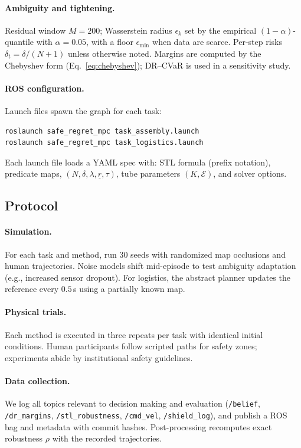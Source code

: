 \documentclass[journal]{IEEEtran}
\theoremstyle{definition}
\begin{document}
\paragraph*{Ambiguity and tightening.}
Residual window $M=200$; Wasserstein radius $\epsilon_k$ set by the empirical $(1-\alpha)$-quantile with $\alpha=0.05$,
with a floor $\epsilon_{\min}$ when data are scarce. Per-step risks $\delta_t=\delta/(N{+}1)$ unless otherwise noted.
Margins are computed by the Chebyshev form (Eq.~\eqref{eq:chebyshev}); DR--CVaR is used in a sensitivity study.

\paragraph*{ROS configuration.}
Launch files spawn the graph for each task:
\begin{verbatim}
roslaunch safe_regret_mpc task_assembly.launch
roslaunch safe_regret_mpc task_logistics.launch
\end{verbatim}
Each launch file loads a YAML spec with: STL formula (prefix notation), predicate maps,
$(N,\delta,\lambda,\underline r,\tau)$, tube parameters $(K,\mathcal{E})$, and solver options.

\subsection{Protocol}
\paragraph*{Simulation.}
For each task and method, run $30$ seeds with randomized map occlusions and human trajectories.
Noise models shift mid-episode to test ambiguity adaptation (e.g., increased sensor dropout).
For logistics, the abstract planner updates the reference every $0.5$\,s using a partially known map.

\paragraph*{Physical trials.}
Each method is executed in three repeats per task with identical initial conditions.
Human participants follow scripted paths for safety zones; experiments abide by institutional safety guidelines.

\paragraph*{Data collection.}
We log all topics relevant to decision making and evaluation (\texttt{/belief}, \texttt{/dr\_margins},
\texttt{/stl\_robustness}, \texttt{/cmd\_vel}, \texttt{/shield\_log}), and publish a ROS bag and metadata
with commit hashes. Post-processing recomputes exact robustness $\rho$ with the recorded trajectories.
\end{document}
